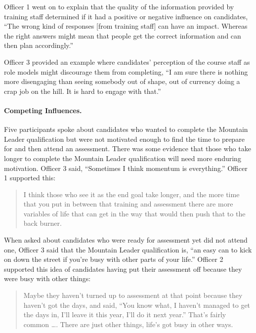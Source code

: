 \documentclass[
  12pt,
  a4paper,
]{book}
\begin{document}
Officer 1 went on to explain that the quality of the information provided by training staff determined if it had a positive or negative influence on candidates, ``The wrong kind of responses {[}from training staff{]} can have an impact. Whereas the right answers might mean that people get the correct information and can then plan accordingly.''

Officer 3 provided an example where candidates' perception of the course staff as role models might discourage them from completing, ``I am sure there is nothing more disengaging than seeing somebody out of shape, out of currency doing a crap job on the hill. It is hard to engage with that.''

\hypertarget{competing-influences.}{%
\paragraph{Competing Influences.}\label{competing-influences.}}

Five participants spoke about candidates who wanted to complete the Mountain Leader qualification but were not motivated enough to find the time to prepare for and then attend an assessment. There was some evidence that those who take longer to complete the Mountain Leader qualification will need more enduring motivation. Officer 3 said, ``Sometimes I think momentum is everything.'' Officer 1 supported this:

\begin{quote}
I think those who see it as the end goal take longer, and the more time that you put in between that training and assessment there are more variables of life that can get in the way that would then push that to the back burner.
\end{quote}

When asked about candidates who were ready for assessment yet did not attend one, Officer 3 said that the Mountain Leader qualification is, ``an easy can to kick on down the street if you're busy with other parts of your life.'' Officer 2 supported this idea of candidates having put their assessment off because they were busy with other things:

\begin{quote}
Maybe they haven't turned up to assessment at that point because they haven't got the days, and said, ``You know what, I haven't managed to get the days in, I'll leave it this year, I'll do it next year.'' That's fairly common \ldots. There are just other things, life's got busy in other ways.
\end{quote}
\end{document}
